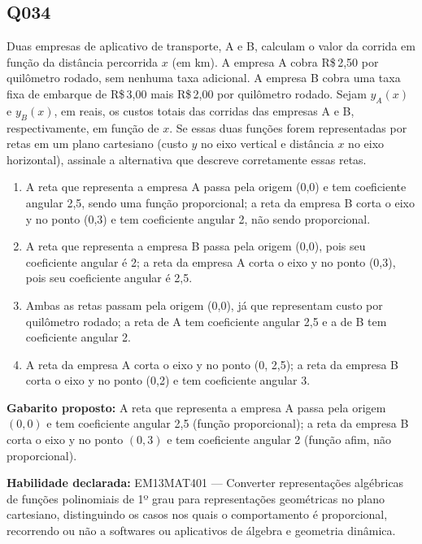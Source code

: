\documentclass[11pt,a4paper]{article}
\begin{document}
\begin{samepage}
\subsection*{Q034}
Duas empresas de aplicativo de transporte, A e B, calculam o valor da corrida em função da distância percorrida $x$ (em km). A empresa A cobra R\$\,2,50 por quilômetro rodado, sem nenhuma taxa adicional. A empresa B cobra uma taxa fixa de embarque de R\$\,3,00 mais R\$\,2,00 por quilômetro rodado. Sejam $y_A(x)$ e $y_B(x)$, em reais, os custos totais das corridas das empresas A e B, respectivamente, em função de $x$. Se essas duas funções forem representadas por retas em um plano cartesiano (custo $y$ no eixo vertical e distância $x$ no eixo horizontal), assinale a alternativa que descreve corretamente essas retas.
\begin{enumerate}[label=(\alph*),nosep,leftmargin=*]
\item A reta que representa a empresa A passa pela origem (0,0) e tem coeficiente angular 2,5, sendo uma função proporcional; a reta da empresa B corta o eixo y no ponto (0,3) e tem coeficiente angular 2, não sendo proporcional.
\item A reta que representa a empresa B passa pela origem (0,0), pois seu coeficiente angular é 2; a reta da empresa A corta o eixo y no ponto (0,3), pois seu coeficiente angular é 2,5.
\item Ambas as retas passam pela origem (0,0), já que representam custo por quilômetro rodado; a reta de A tem coeficiente angular 2,5 e a de B tem coeficiente angular 2.
\item A reta da empresa A corta o eixo y no ponto (0, 2,5); a reta da empresa B corta o eixo y no ponto (0,2) e tem coeficiente angular 3.
\end{enumerate}

\textbf{Gabarito proposto:} A reta que representa a empresa A passa pela origem $(0,0)$ e tem coeficiente angular 2,5 (função proporcional); a reta da empresa B corta o eixo y no ponto $(0,3)$ e tem coeficiente angular 2 (função afim, não proporcional).

\textbf{Habilidade declarada:} EM13MAT401 --- Converter representações algébricas de funções polinomiais de 1º grau para representações geométricas no plano cartesiano, distinguindo os casos nos quais o comportamento é proporcional, recorrendo ou não a softwares ou aplicativos de álgebra e geometria dinâmica.
\end{samepage}
\end{document}
